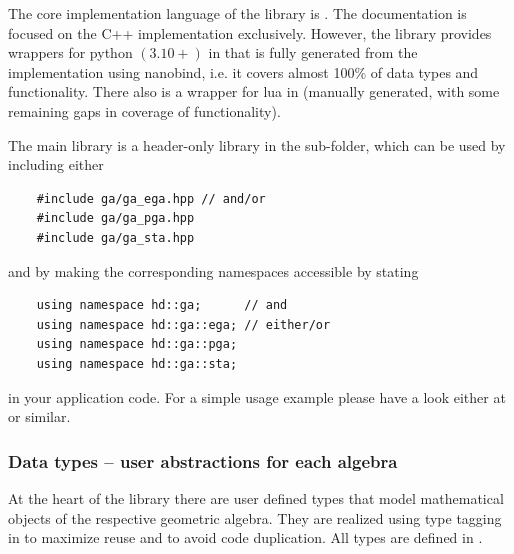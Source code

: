 The core implementation language of the library is \Cpp. The documentation is focused on
the C++ implementation exclusively. However, the library provides wrappers for python
$(3.10+)$ in  that is fully generated from the \Cpp implementation using
nanobind, i.e. it covers almost 100\% of \Cpp data types and functionality. There also is
a wrapper for lua in  (manually generated, with some remaining gaps in
coverage of \Cpp functionality).

\newpage

The main library is a header-only library in the  sub-folder, which can be used
by including either
\begin{verbatim}
    #include ga/ga_ega.hpp // and/or
    #include ga/ga_pga.hpp
    #include ga/ga_sta.hpp
\end{verbatim}
and by making the corresponding namespaces accessible by stating
\begin{verbatim}
    using namespace hd::ga;      // and
    using namespace hd::ga::ega; // either/or
    using namespace hd::ga::pga;
    using namespace hd::ga::sta;
\end{verbatim}
in your application code. For a simple usage example please have a look either at
 or similar. \\

\subsubsection{Data types -- user abstractions for each algebra}
\label{subsection:data_types}

At the heart of the library there are user defined types that model mathematical objects
of the respective geometric algebra. They are realized using type tagging in \Cpp to
maximize reuse and to avoid code duplication. All types are defined in
. \\

